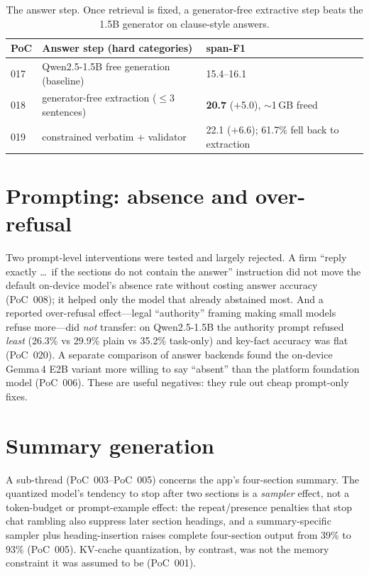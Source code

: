 \documentclass[11pt]{article}
\newcommand{\poc}[1]{PoC~#1}
\begin{document}
\begin{table}[t]
\centering
\small
\begin{tabular}{l l l}
\toprule
PoC & Answer step (hard categories) & span-F1 \\
\midrule
017 & Qwen2.5-1.5B free generation (baseline)     & 15.4--16.1 \\
018 & generator-free extraction ($\leq$3 sentences) & \textbf{20.7} ($+$5.0), $\sim$1\,GB freed \\
019 & constrained verbatim + validator            & 22.1 ($+$6.6); 61.7\% fell back to extraction \\
\bottomrule
\end{tabular}
\caption{The answer step. Once retrieval is fixed, a generator-free extractive step beats the
1.5B generator on clause-style answers.}
\label{tab:answer}
\end{table}

\section{Prompting: absence and over-refusal}\label{sec:prompting}
Two prompt-level interventions were tested and largely rejected. A firm ``reply exactly \dots\
if the sections do not contain the answer'' instruction did not move the default on-device
model's absence rate without costing answer accuracy (\poc{008}); it helped only the model that
already abstained most. And a reported over-refusal effect---legal ``authority'' framing making
small models refuse more---did \emph{not} transfer: on Qwen2.5-1.5B the authority prompt refused
\emph{least} (26.3\% vs 29.9\% plain vs 35.2\% task-only) and key-fact accuracy was flat
(\poc{020}). A separate comparison of answer backends found the on-device Gemma\,4 E2B variant
\citep{gemma} more willing to say ``absent'' than the platform foundation model (\poc{006}). These are useful
negatives: they rule out cheap prompt-only fixes.

\section{Summary generation}\label{sec:summary}
A sub-thread (\poc{003}--\poc{005}) concerns the app's four-section summary. The quantized
model's tendency to stop after two sections is a \emph{sampler} effect, not a token-budget or
prompt-example effect: the repeat/presence penalties that stop chat rambling also suppress
later section headings, and a summary-specific sampler plus heading-insertion raises complete
four-section output from 39\% to 93\% (\poc{005}). KV-cache quantization, by contrast, was not
the memory constraint it was assumed to be (\poc{001}).
\end{document}

